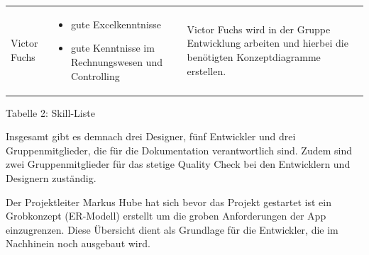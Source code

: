 \documentclass[12pt,a4paper]{article}
\begin{document}
\begin{tabular}{|m{5cm}|m{5cm}|m{5cm}|}
\\
\hline
\centering Victor Fuchs & \begin {itemize}
\item  gute Excelkenntnisse
\item  gute Kenntnisse im Rechnungswesen und Controlling
\end {itemize}
& Victor Fuchs wird in der Gruppe Entwicklung arbeiten und hierbei die benötigten Konzeptdiagramme erstellen.
\end{tabular}
\footnotesize Tabelle 2: Skill-Liste
\normalsize
\\
\linebreak
\newline
\newline

Insgesamt gibt es demnach drei Designer, fünf Entwickler und drei Gruppenmitglieder, die für die Dokumentation verantwortlich sind. Zudem sind zwei Gruppenmitglieder für das stetige Quality Check bei den Entwicklern und Designern zuständig.

Der Projektleiter Markus Hube hat sich bevor das Projekt gestartet ist ein Grobkonzept (ER-Modell) erstellt um die groben Anforderungen der App einzugrenzen. Diese Übersicht dient als Grundlage für die Entwickler, die im Nachhinein noch ausgebaut wird.
\newpage
\end{document}
